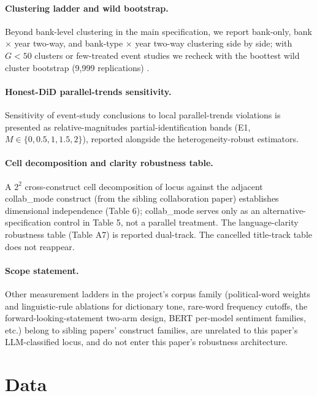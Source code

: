 \paragraph{Clustering ladder and wild bootstrap.}
Beyond bank-level clustering in the main specification, we report bank-only, bank
$\times$ year two-way, and bank-type $\times$ year two-way clustering side by side; with
$G<50$ clusters or few-treated event studies we recheck with the boottest wild cluster
bootstrap (9{,}999 replications) \parencite{roodman2019boottest}.

\paragraph{Honest-DiD parallel-trends sensitivity.}
Sensitivity of event-study conclusions to local parallel-trends violations is presented
as \textcite{rambachan2023honestdid} relative-magnitudes partial-identification bands
(E1, $M \in \{0,0.5,1,1.5,2\}$), reported alongside the heterogeneity-robust estimators.

\paragraph{Cell decomposition and clarity robustness table.}
A $2^2$ cross-construct cell decomposition of locus against the adjacent collab\_mode
construct (from the sibling collaboration paper) establishes dimensional independence
(Table 6); collab\_mode serves only as an alternative-specification control in Table 5,
not a parallel treatment. The language-clarity robustness table (Table A7) is reported
dual-track. The cancelled title-track table does not reappear.

\paragraph{Scope statement.}
Other measurement ladders in the project's corpus family (political-word weights and
linguistic-rule ablations for dictionary tone, rare-word frequency cutoffs, the
forward-looking-statement two-arm design, BERT per-model sentiment families, etc.)
belong to sibling papers' construct families, are unrelated to this paper's
LLM-classified locus, and do not enter this paper's robustness architecture.

\section{Data}\label{sec:data}


